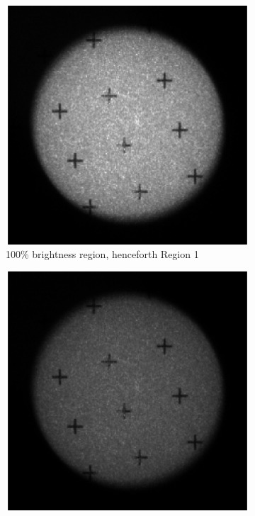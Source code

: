 \documentclass[10pt]{scrartcl}
\begin{document}
\begin{figure}[!ht]
    \begin{subfigure}[b]{.3\linewidth}
        \centering
        \includegraphics[width=1.3\textwidth]{../plots_tables_images/tritest_reg1}
        \caption{100\% brightness region, henceforth Region 1}
    \end{subfigure}
    \begin{subfigure}[b]{.3\linewidth}
        \centering
        \includegraphics[width=1.3\textwidth]{../plots_tables_images/tritest_reg2}

\end{subfigure}
\end{figure}
\end{document}
